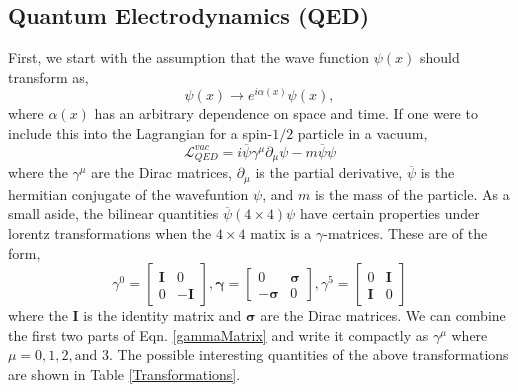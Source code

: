  \subsection{Quantum Electrodynamics (QED)}
 
 First, we start with the assumption that the wave function $\psi(x)$ should transform as,
 \begin{equation}\label{U1gauge}
 \psi(x)\rightarrow e^{i\alpha(x)}\psi(x),
 \end{equation}
 where $\alpha(x)$ has an arbitrary dependence on space and time. 
 If one were to include this into the Lagrangian for a spin-$1/2$ particle in a vacuum,
 \begin{equation}\label{DiracLag}
\mathcal{L}_{QED}^{vac}=i\overline{\psi}\gamma^\mu\partial_\mu\psi-m\overline{\psi}\psi
\end{equation}
 where the $\gamma^\mu$ are the Dirac matrices, $\partial_\mu$ is the partial derivative, $\overline{\psi}$ is the hermitian conjugate of the wavefuntion $\psi$, and $m$ is the mass of the particle. As a small aside, the bilinear quantities $\overline{\psi}(4\times4)\psi$ have certain properties under lorentz transformations when the $4\times4$ matix is a $\gamma$-matrices. These are of the form,
\begin{equation} \label{gammaMatrix}
\gamma^0=
\begin{bmatrix}
\boldsymbol{I} & 0 \\
0 & -\boldsymbol{I}
\end{bmatrix},
\boldsymbol{\gamma}=
\begin{bmatrix}
0 & \boldsymbol{\sigma} \\
-\boldsymbol{\sigma} & 0
\end{bmatrix},
\gamma^5=
\begin{bmatrix}
0 & \boldsymbol{I} \\
\boldsymbol{I} & 0
\end{bmatrix}
\end{equation}
where the $\boldsymbol{I}$ is the identity matrix and $\boldsymbol{\sigma}$ are the Dirac matrices. We can combine the first two parts of Eqn. \ref{gammaMatrix} and write it compactly as $\gamma^\mu$ where $\mu=0,1,2, \text{and }3$. The possible interesting quantities of the above transformations are shown in Table \ref{Transformations}.

